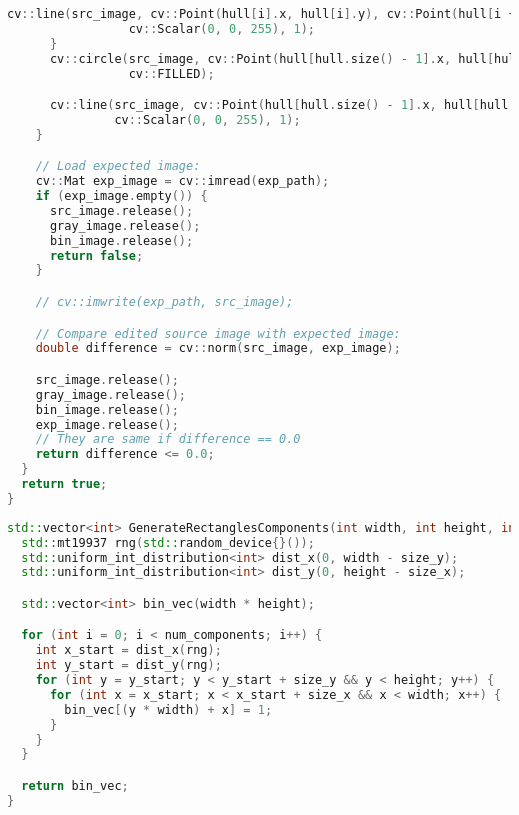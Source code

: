 \documentclass[12pt]{article}
\begin{document}
\begin{lstlisting}[language=C++, caption={Функция ImageRunTest() проверки корректности с помощью OpenCV}]
        cv::line(src_image, cv::Point(hull[i].x, hull[i].y), cv::Point(hull[i + 1].x, hull[i + 1].y),
                 cv::Scalar(0, 0, 255), 1);
      }
      cv::circle(src_image, cv::Point(hull[hull.size() - 1].x, hull[hull.size() - 1].y), 2, cv::Scalar(0, 0, 255),
                 cv::FILLED);

      cv::line(src_image, cv::Point(hull[hull.size() - 1].x, hull[hull.size() - 1].y), cv::Point(hull[0].x, hull[0].y),
               cv::Scalar(0, 0, 255), 1);
    }

    // Load expected image:
    cv::Mat exp_image = cv::imread(exp_path);
    if (exp_image.empty()) {
      src_image.release();
      gray_image.release();
      bin_image.release();
      return false;
    }

    // cv::imwrite(exp_path, src_image);

    // Compare edited source image with expected image:
    double difference = cv::norm(src_image, exp_image);

    src_image.release();
    gray_image.release();
    bin_image.release();
    exp_image.release();
    // They are same if difference == 0.0
    return difference <= 0.0;
  }
  return true;
}
\end{lstlisting}

\label{appendix:generate_rectangles_components}
\begin{lstlisting}[language=C++, caption={Функция GenerateRectanglesComponents() генерации массива пикселей}]
std::vector<int> GenerateRectanglesComponents(int width, int height, int num_components, int size_y, int size_x) {
  std::mt19937 rng(std::random_device{}());
  std::uniform_int_distribution<int> dist_x(0, width - size_y);
  std::uniform_int_distribution<int> dist_y(0, height - size_x);

  std::vector<int> bin_vec(width * height);

  for (int i = 0; i < num_components; i++) {
    int x_start = dist_x(rng);
    int y_start = dist_y(rng);
    for (int y = y_start; y < y_start + size_y && y < height; y++) {
      for (int x = x_start; x < x_start + size_x && x < width; x++) {
        bin_vec[(y * width) + x] = 1;
      }
    }
  }

  return bin_vec;
}
\end{lstlisting}
\end{document}
